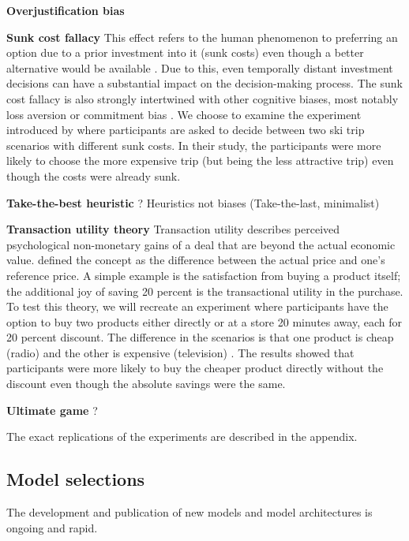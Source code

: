 \par \textbf{Overjustification bias} 

\par \textbf{Sunk cost fallacy} This effect refers to the human phenomenon to preferring an option due to a prior investment into it (sunk costs) even though a better alternative would be available \parencite{arkes1985psychology}. Due to this, even temporally distant investment decisions can have a substantial impact on the decision-making process. The sunk cost fallacy is also strongly intertwined with other cognitive biases, most notably loss aversion or commitment bias \parencite{jarmolowicz2016sunk}. We choose to examine the experiment introduced by \textcite{arkes1985psychology} where participants are asked to decide between two ski trip scenarios with different sunk costs. In their study, the participants were more likely to choose the more expensive trip (but being the less attractive trip) even though the costs were already sunk.

\par \textbf{Take-the-best heuristic} ? Heuristics not biases (Take-the-last, minimalist)

\par \textbf{Transaction utility theory} Transaction utility describes perceived psychological non-monetary gains of a deal that are beyond the actual economic value. \textcite{thaler1983transaction} defined the concept as the difference between the actual price and one's reference price. A simple example is the satisfaction from buying a product itself; the additional joy of saving 20 percent is the transactional utility in the purchase. To test this theory, we will recreate an experiment where participants have the option to buy two products either directly or at a store 20 minutes away, each for 20 percent discount. The difference in the scenarios is that one product is cheap (radio) and the other is expensive (television) \parencite{thaler1983transaction}. The results showed that participants were more likely to buy the cheaper product directly without the discount even though the absolute savings were the same.

\par \textbf{Ultimate game} ?

\setlength{\parindent}{0pt}
The exact replications of the experiments are described in the appendix.


\subsection{Model selections}
\par The development and publication of new models and model architectures is ongoing and rapid. 

